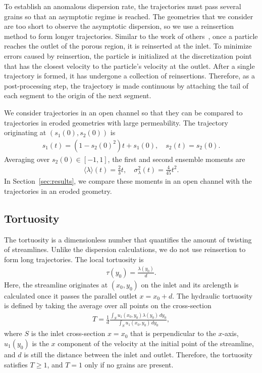 \documentclass[preprint,10pt]{elsarticle}
\begin{document}
To establish an anomalous dispersion rate, the trajectories must pass
several grains so that an asymptotic regime is reached. The geometries
that we consider are too short to observe the asymptotic dispersion, so
we use a reinsertion method to form longer trajectories. Similar to the
work of others~\cite{dea-qua-bir-jua2018, puy-gou-den2019}, once a
particle reaches the outlet of the porous region, it is reinserted at
the inlet.  To minimize errors caused by reinsertion, the particle is
initialized at the discretization point that has the closest velocity to
the particle's velocity at the outlet.  After a single trajectory is
formed, it has undergone a collection of reinsertions.  Therefore, as a
post-processing step, the trajectory is made continuous by attaching the
tail of each segment to the origin of the next segment.  

We consider trajectories in an open channel so that they can be compared
to trajectories in eroded geometries with large permeability.  The
trajectory originating at $(s_1(0),s_2(0))$ is
\begin{align}
  s_1(t) = (1-s_2(0)^2)t + s_1(0), \quad
  s_2(t) = s_2(0).
\end{align}
Averaging over $s_2(0) \in [-1,1]$, the first and second ensemble
moments are
\begin{align}
  \langle \lambda \rangle (t) = \frac{2}{3}t, \quad 
    \sigma_\lambda^2(t) = \frac{4}{45}t^2.
\end{align}
In Section~\ref{sec:results}, we compare these moments in an open
channel with the trajectories in an eroded geometry.

\subsection{Tortuosity}
The tortuosity is a dimensionless number that quantifies the amount of
twisting of streamlines. Unlike the dispersion calculations, we do not
use reinsertion to form long trajectories.  The local tortuosity is
\begin{align}
  \tau(y_0) = \frac{\lambda(y_0)}{d}.
  \label{eqn:localTort}
\end{align}
Here, the streamline originates at $(x_0,y_0)$ on the inlet and its
arclength is calculated once it passes the parallel outlet $x = x_0 +
d$.  The hydraulic tortuosity is defined by taking the average over all
points on the cross-section
\begin{align}
  T = \frac{1}{d}\frac{\displaystyle\int_{S}u_1(x_0,y_0)\lambda(y_0)\,dy_0}
  {\displaystyle\int_{S}u_1(x_0,y_0)\,dy_0},
  \label{eqn:tortuosity1}
\end{align}
where $S$ is the inlet cross-section $x = x_0$ that is perpendicular to
the $x$-axis, $u_1(y_0)$ is the $x$ component of the velocity at the
initial point of the streamline, and $d$ is still the distance between
the inlet and outlet. Therefore, the tortuosity satisfies $T \geq 1$,
and $T=1$ only if no grains are present.  
\end{document}
